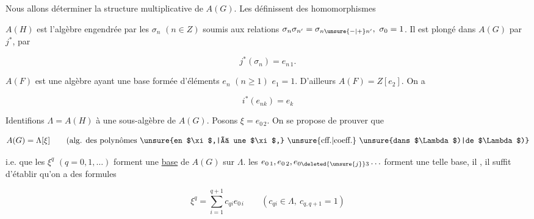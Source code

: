 
Nous allons déterminer la structure multiplicative de $A(G)$. Les   définissent des homomorphismes


$A(H)$ est l'algèbre  engendrée par les $\sigma_n$ $(n\in Z)$ soumis aux relations $\sigma_n\sigma_{n'}=\sigma_{n\unsure{-|+}n'},\ \sigma_0=1$. Il est plongé dans $A(G)$ par $j^*$, par

\[ j^*(\sigma_n)=e_{n\,1}. \]

$A(F)$ est  une algèbre ayant une base formée d'éléments $e_n$ $(n\geq1)$  $e_1=1$. D'ailleurs $A(F)=Z[e_2]$. On a

\[ i^*(e_{nk})=e_k \]

Identifions $\Lambda=A(H)$ à une sous-algèbre de $A(G)$. Posons $\xi=e_{0\,2}$. On se propose de prouver que

\[ A(G)=\Lambda[\xi]\qquad\text{(alg. des polynômes \unsure{en $\xi$,|à une $\xi$,} \unsure{cff.|coeff.} \unsure{dans $\Lambda$)|de $\Lambda$)}} \]

i.e. que les $\xi^q$ $(q=0,1,\ldots)$ forment une \uline{base} de $A(G)$ sur $\Lambda$.  les $e_{0\,1},e_{0\,2},e_{0\deleted{\unsure{j}}3}\ldots$ forment une telle base, il , il suffit d'établir qu'on a des formules

\[ \xi^q=\sum_{i=1}^{q+1}c_{qi}e_{0\,i}\qquad(c_{qi}\in\Lambda,\ c_{q,q+1}=1)\tag*{(1)} \]

